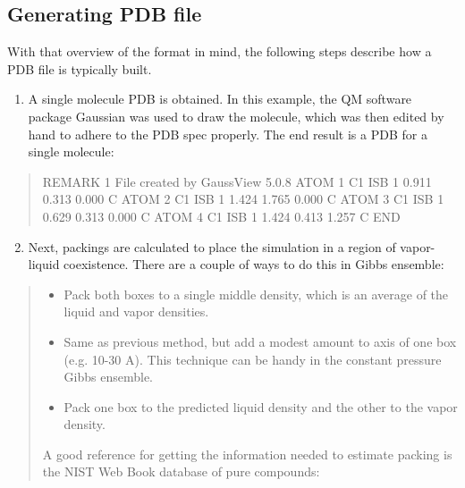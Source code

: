 \documentclass[letterpaper,10pt,english]{sphinxmanual}
\begin{document}
\subsection{Generating PDB file}
\label{\detokenize{input_file:generating-pdb-file}}
With that overview of the format in mind, the following steps describe how a PDB file is typically built.
\begin{enumerate}
\item {} 
A single molecule PDB is obtained. In this example, the QM software package Gaussian was used to draw the molecule, which was then edited by hand to adhere to the PDB spec properly. The end result is a PDB for a single molecule:

\end{enumerate}
\begin{quote}

%
\begin{sphinxVerbatim}[commandchars=\\\{\}]
REMARK   1 File created by GaussView 5.0.8
ATOM     1  C1   ISB  1   0.911  \PYGZhy{}0.313    0.000  C
ATOM     2  C1   ISB  1   1.424  \PYGZhy{}1.765    0.000  C
ATOM     3  C1   ISB  1  \PYGZhy{}0.629  \PYGZhy{}0.313    0.000  C
ATOM     4  C1   ISB  1   1.424   0.413   \PYGZhy{}1.257  C
END
\end{sphinxVerbatim}
\end{quote}
\begin{enumerate}
\setcounter{enumi}{1}
\item {} 
Next, packings are calculated to place the simulation in a region of vapor-liquid coexistence. There are a couple of ways to do this in Gibbs ensemble:

\end{enumerate}
\begin{quote}
\begin{itemize}
\item {} 
Pack both boxes to a single middle density, which is an average of the liquid and vapor densities.

\item {} 
Same as previous method, but add a modest amount to axis of one box (e.g. 10-30 A). This technique can be handy in the constant pressure Gibbs ensemble.

\item {} 
Pack one box to the predicted liquid density and the other to the vapor density.

\end{itemize}

A good reference for getting the information needed to estimate packing is the NIST Web Book database of pure compounds:

\end{quote}
\end{document}
